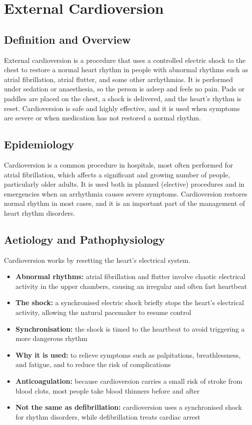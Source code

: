 \chapter{External Cardioversion}

\section*{Definition and Overview}
External cardioversion is a procedure that uses a controlled electric shock to the chest to restore a normal heart rhythm in people with abnormal rhythms such as atrial fibrillation, atrial flutter, and some other arrhythmias. It is performed under sedation or anaesthesia, so the person is asleep and feels no pain. Pads or paddles are placed on the chest, a shock is delivered, and the heart's rhythm is reset. Cardioversion is safe and highly effective, and it is used when symptoms are severe or when medication has not restored a normal rhythm.

\section*{Epidemiology}
Cardioversion is a common procedure in hospitals, most often performed for atrial fibrillation, which affects a significant and growing number of people, particularly older adults. It is used both in planned (elective) procedures and in emergencies when an arrhythmia causes severe symptoms. Cardioversion restores normal rhythm in most cases, and it is an important part of the management of heart rhythm disorders.

\section*{Aetiology and Pathophysiology}
Cardioversion works by resetting the heart's electrical system.
\begin{itemize}
    \item \textbf{Abnormal rhythms:} atrial fibrillation and flutter involve chaotic electrical activity in the upper chambers, causing an irregular and often fast heartbeat
    \item \textbf{The shock:} a synchronised electric shock briefly stops the heart's electrical activity, allowing the natural pacemaker to resume control
    \item \textbf{Synchronisation:} the shock is timed to the heartbeat to avoid triggering a more dangerous rhythm
    \item \textbf{Why it is used:} to relieve symptoms such as palpitations, breathlessness, and fatigue, and to reduce the risk of complications
    \item \textbf{Anticoagulation:} because cardioversion carries a small risk of stroke from blood clots, most people take blood thinners before and after
    \item \textbf{Not the same as defibrillation:} cardioversion uses a synchronised shock for rhythm disorders, while defibrillation treats cardiac arrest
\end{itemize}

